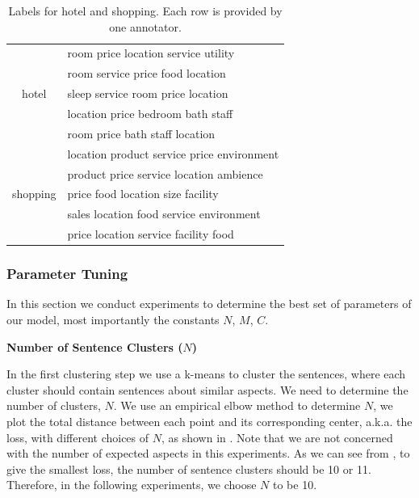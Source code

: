 \begin{table}[th]
\centering
\caption{Labels for hotel and shopping. Each row is provided by one annotator.}
\label{table:labels}
\begin{tabular}{|c|l|}
\hline
\multirow{5}{*}{hotel}
& room price location service utility \\
& room service price food location  \\
& sleep service room price location  \\
& location price bedroom bath staff  \\
& room price bath staff location  \\\hline

\multirow{5}{*}{shopping}
& location product service price environment \\
& product price service location ambience \\
& price food location size facility \\
& sales location food service environment \\
& price location service facility food \\\hline
\end{tabular}
\end{table}

\subsubsection{Parameter Tuning}

In this section we conduct experiments to determine the best set of
parameters of our model, most importantly the constants $N$, $M$, $C$.

\textbf{Number of Sentence Clusters ($N$)}

In the first clustering step we use a k-means to cluster the sentences,
where each cluster should contain sentences about similar aspects.
We need to determine the number of clusters, $N$.
We use an empirical elbow method to determine $N$, 
we plot the total distance between each point and its corresponding center,
a.k.a. the loss, with different choices of $N$, 
as shown in .
Note that we are not concerned with the number of expected aspects 
in this experiments. 
As we can see from ,
to give the smallest loss, the number of sentence clusters should be
10 or 11.  Therefore, in the following experiments, we choose $N$ to be 10.

